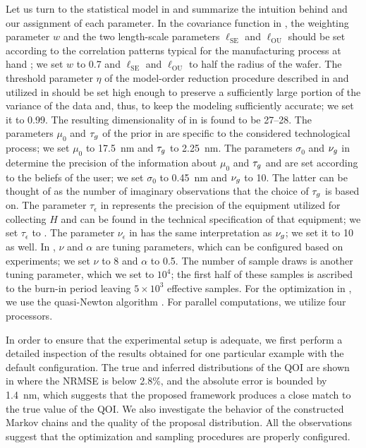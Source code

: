 Let us turn to the statistical model in  and
summarize the intuition behind and our assignment of each parameter. In the
covariance function in , the weighting parameter $w$
and the two length-scale parameters $\ell_\text{SE}$ and $\ell_\text{OU}$ should
be set according to the correlation patterns typical for the manufacturing
process at hand \cite{chandrakasan2000, cheng2011}; we set $w$ to 0.7 and
$\ell_\text{SE}$ and $\ell_\text{OU}$ to half the radius of the wafer. The
threshold parameter $\eta$ of the model-order reduction procedure described in
 and utilized in  should be set
high enough to preserve a sufficiently large portion of the variance of the data
and, thus, to keep the modeling sufficiently accurate; we set it to 0.99. The
resulting dimensionality \nz of \vz in  is found to be
27--28. The parameters $\mu_0$ and $\tau_g$ of the prior in
 are specific to the considered technological process; we
set $\mu_0$ to 17.5~nm and $\tau_g$ to 2.25~nm. The parameters $\sigma_0$ and
$\nu_g$ in  determine the precision of the information
about $\mu_0$ and $\tau_g$ and are set according to the beliefs of the user; we
set $\sigma_0$ to 0.45~nm and $\nu_g$ to 10. The latter can be thought of as
the number of imaginary observations that the choice of $\tau_g$ is based on.
The parameter $\tau_\epsilon$ in  represents the precision
of the equipment utilized for collecting $H$ and can be found in the technical
specification of that equipment; we set $\tau_\epsilon$ to . The
parameter $\nu_\epsilon$ in  has the same interpretation
as $\nu_g$; we set it to 10 as well. In , $\nu$ and
$\alpha$ are tuning parameters, which can be configured based on experiments; we
set $\nu$ to 8 and $\alpha$ to 0.5. The number of sample draws is another tuning
parameter, which we set to $10^4$; the first half of these samples is ascribed
to the burn-in period leaving $5 \times 10^3$ effective samples. For the
optimization in , we use the quasi-Newton algorithm
\cite{press2007}. For parallel computations, we utilize four processors.

In order to ensure that the experimental setup is adequate, we first perform a
detailed inspection of the results obtained for one particular example with the
default configuration. The true and inferred distributions of the \ac{QOI} are
shown in  where the \acf{NRMSE} is below 2.8\%, and the
absolute error is bounded by 1.4~nm, which suggests that the proposed framework
produces a close match to the true value of the \ac{QOI}. We also investigate
the behavior of the constructed Markov chains and the quality of the proposal
distribution. All the observations suggest that the optimization and sampling
procedures are properly configured.

